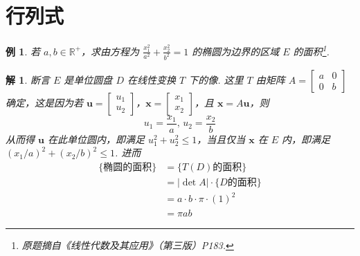 \documentclass[UTF8,11pt]{ctexart}
\newtheorem{example}{例}
\newtheorem*{answer}{解}
\begin{document}
\section{行列式}
\begin{example}
若 $a,b\in\mathbb{R}^+$，求由方程为 $\displaystyle\frac{x_1^2}{a^2}+\frac{x_2^2}{b^2}=1$ 的椭圆为边界的区域 $E$ 的面积\footnote{原题摘自《线性代数及其应用》（第三版）P183.}.
\end{example}
\begin{answer}
断言 $E$ 是单位圆盘 $D$ 在线性变换 $T$ 下的像.
这里 $T$ 由矩阵 $A=\begin{bmatrix}a & 0\\0 & b\end{bmatrix}$ 确定，这是因为若 $\mathbf{u}=\begin{bmatrix}u_1\\u_2\end{bmatrix}$，$\mathbf{x}=\begin{bmatrix}x_1\\x_2\end{bmatrix}$，且 $\mathbf{x}=A\mathbf{u}$，则
\[u_1=\frac{x_1}{a},\,u_2=\frac{x_2}{b}\]
从而得 $\mathbf{u}$ 在此单位圆内，即满足 $u_1^2+u_2^2\leq 1$，当且仅当 $\mathbf{x}$ 在 $E$ 内，即满足 $(x_1/a)^2+(x_2/b)^2\leq 1$.
进而
\[\begin{aligned}
\{\text{椭圆的面积}\} &= \{T(D)\text{的面积}\}\\
&=|\det A|\cdot\{D\text{的面积}\}\\
&=a\cdot b\cdot \pi\cdot (1)^2\\
&=\pi ab
\end{aligned}\]
\end{answer}
\end{document}
